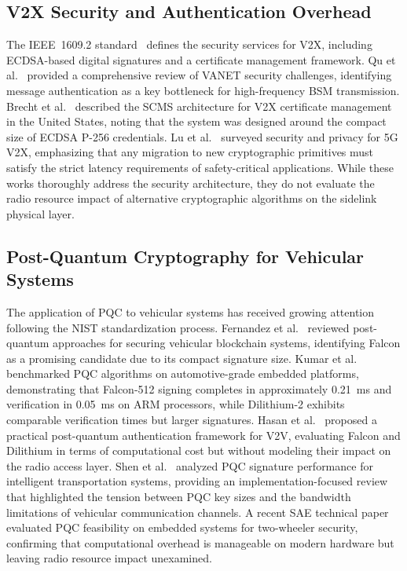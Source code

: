 \documentclass[letterpaper,journal]{IEEEtran}
\begin{document}
\subsection{V2X Security and Authentication Overhead}

The IEEE~1609.2 standard~\cite{ieee_16092} defines the security services for V2X, including ECDSA-based digital signatures and a certificate management framework. Qu et al.~\cite{qu2015security} provided a comprehensive review of VANET security challenges, identifying message authentication as a key bottleneck for high-frequency BSM transmission. Brecht et al.~\cite{brecht2018scms} described the SCMS architecture for V2X certificate management in the United States, noting that the system was designed around the compact size of ECDSA P-256 credentials. Lu et al.~\cite{lu2018survey_v2x_security} surveyed security and privacy for 5G V2X, emphasizing that any migration to new cryptographic primitives must satisfy the strict latency requirements of safety-critical applications. While these works thoroughly address the security architecture, they do not evaluate the radio resource impact of alternative cryptographic algorithms on the sidelink physical layer.

\subsection{Post-Quantum Cryptography for Vehicular Systems}

The application of PQC to vehicular systems has received growing attention following the NIST standardization process. Fernandez et al.~\cite{fernandez2023pqc_v2x} reviewed post-quantum approaches for securing vehicular blockchain systems, identifying Falcon as a promising candidate due to its compact signature size. Kumar et al.~\cite{kumar2024pqc_automotive} benchmarked PQC algorithms on automotive-grade embedded platforms, demonstrating that Falcon-512 signing completes in approximately 0.21~ms and verification in 0.05~ms on ARM processors, while Dilithium-2 exhibits comparable verification times but larger signatures. Hasan et al.~\cite{hasan2022pqc_v2v} proposed a practical post-quantum authentication framework for V2V, evaluating Falcon and Dilithium in terms of computational cost but without modeling their impact on the radio access layer. Shen et al.~\cite{shen2025pqc_analysis} analyzed PQC signature performance for intelligent transportation systems, providing an implementation-focused review that highlighted the tension between PQC key sizes and the bandwidth limitations of vehicular communication channels. A recent SAE technical paper~\cite{sae2026pqc_twowheeler} evaluated PQC feasibility on embedded systems for two-wheeler security, confirming that computational overhead is manageable on modern hardware but leaving radio resource impact unexamined.
\end{document}
